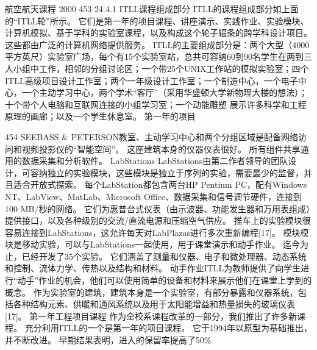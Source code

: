 \documentclass[UTF8,11pt,a4paper,openany,fontset=fandol]{ctexbook}
\begin{document}
航空航天课程 2000 453 24.4.1 ITLL课程组成部分 ITLL的课程组成部分如上面的“ITLL轮”所示。 它们是第一年的项目课程、讲座演示、实践作业、实验模块、计算机模拟、基于学科的实验室课程，以及构成这个轮子辐条的跨学科设计项目。 这些都由广泛的计算机网络提供服务。 ITLL的主要组成部分是：两个大型（4000平方英尺）实验室广场，每个有15个实验室站，总共可容纳60到90名学生在两到三人小组中工作，相邻的分组讨论区；一个带25个UNIX工作站的模拟实验室；四个ITLL高级项目设计工作室；两个一年级设计工作室；一个制造中心，一个电子中心，一个主动学习中心，两个学术“客厅”（采用华盛顿大学新物理大楼的想法）；十个带个人电脑和互联网连接的小组学习室；一个动能雕塑 展示许多科学和工程原理的画廊；以及一个学生休息室。 第一年的项目

454 SEEBASS \& PETERSON教室、主动学习中心和两个分组区域是配备网络访问和视频投影仪的“智能空间”。 这座建筑本身的仪器仪表很好。 所有组件共享通用的数据采集和分析软件。 LabStations LabStations由第二作者领导的团队设计，可容纳独立的实验模块，这些模块是独立于序列的实验，需要最少的监督，并且适合开放式探索。 每个LabStation都包含两台HP Pentium PC，配有Windows NT、LabView、MatLab、Microsoft Office、数据采集和信号调节硬件，连接到100 MB/秒的网络。 它们为惠普台式仪表（由示波器、功能发生器和万用表组成）提供接口，以及各种级别的交流/直流电源和压缩空气供应。 推车上的实验模块很容易连接到LabStations，这允许每天对LabPlazas进行多次重新编程[17]。 模块模块是移动实验，可以与LabStations一起使用，用于课堂演示和动手作业。 迄今为止，已经开发了35个实验。 它们涵盖了测量和仪器、电子和微处理器、动态系统和控制、流体力学、传热以及结构和材料。 动手作业ITLL为教师提供了向学生进行“动手”作业的机会，他们可以使用简单的设备和材料来展示他们在课堂上学到的概念。 作为实验室的建筑，建筑本身是一个实验室，有部分暴露和仪器系统，包括各种结构元素、供暖和通风系统以及用于太阳能增益和热量损失的玻璃仪表[17]。 第一年工程项目课程 作为全校系课程改革的一部分，我们推出了许多新课程。 充分利用ITLL的一个是第一年的项目课程。 它于1994年以原型为基础推出，并不断改进。 早期结果表明，进入的保留率提高了50\%
\end{document}
